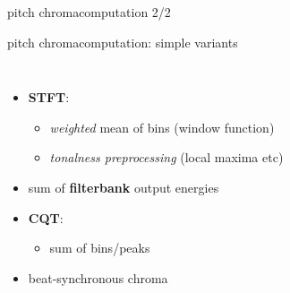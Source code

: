         \begin{frame}{pitch chroma}{computation 2/2}
        \end{frame}
        \begin{frame}{pitch chroma}{computation: simple variants}
            \begin{columns}
            \begin{itemize}
                \item	\textbf{STFT}: 
                    \begin{itemize}
                        \item   \textit{weighted} mean of bins (window function)
                        \item	\textit{tonalness preprocessing} (local maxima etc)
                    \end{itemize}
                    
                \item<2->	sum of \textbf{filterbank} output energies
                   
                \item<3->	\textbf{CQT}: 
                    \begin{itemize}
                        \item sum of bins/peaks
                    \end{itemize}
                \item<4->   beat-synchronous chroma
            \end{itemize}
            
            \end{columns}
        \end{frame}
